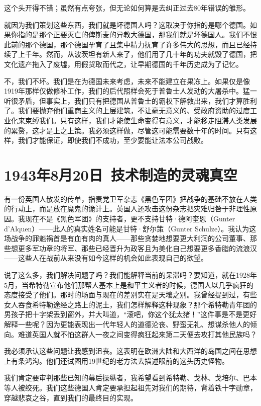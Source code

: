 \documentclass[UTF8]{ctexart}
\begin{document}
这个头开得不错；虽然有点夸张，但无论如何算是去纠正过去80年错误的雏形。

就因为我们策划这些东西，我们就是坏德国人吗？这取决于你指的是哪个德国。如果你指的是那个正要灭亡的俾斯麦的异教大德国，那我们就是坏德国人。我们不恨此前的那个德国，那个德国孕育了且集中精力抚育了许多伟大的思想，而且已经持续了上千年。然而，从波茨坦有新人来了，他们用了几十年的功夫就毁了德国，把文化遗产拖入了废墟，用假货取而代之，让早期德国的千年历史成为了记忆。

不，我们不坏。我们是在为德国未来考虑，未来不能建立在果冻上。如果仅是像1919年那样仅做修补工作，我们的后代照样会死于普鲁士人发动的大屠杀中。猛一听很矛盾，但事实上，我们只有把德国从普鲁士的霸权下解救出来，我们才算胜利了。我们要抛弃他们重商主义的上层建筑，不让毫无意义的、受政府资助的过度工业化来束缚我们。只有这样，我们才能使生命变得有意义，才能移走阻滞人类发展的累赘，这才是上之上策。我必须这样做，尽管这可能需要数十年的时间。只有这样，我们才能保证，即使我们不成功，至少要能让法本公司战败。

\section{1943年8月20日\ 技术制造的灵魂真空}

有一份英国人散发的传单，指责党卫军杂志《黑色军团》把战争的基础不放在人类的行动上，而是放在魔鬼的诡计上。英国人还攻击这份杂志把灾难归咎于非理性原因。我现在不是《黑色军团》的支持者，更不支持甘特·德阿奎恩（Gunter d’Alquen）——此人的真实姓名可能是甘特·舒尔策（Gunter Schulze）。我认为这场战争的罪魁祸首是有血有肉的真人——那些贪婪地想要更大利润的公司董事、那些想更多军功章的将军、那些已经晋升为政客且为美化自己想要更多香脂的流浪汉——这些人在战前从来没有如今这样的机会如此表现自己的欲望。

说了这么多，我们解决问题了吗？我们能解释当前的呆滞吗？要知道，就在1928年5月，当希特勒宣布他们那帮人基本上是和平主义者的时候，德国人以几乎疯狂的态度接受了他们。那时的场面与现在的差别实在是天壤之别。我曾经提到过，有些女人吞食希特勒途经之路上的泥土，我们怎样解释这种现象？那个希特勒青年团的男孩子把十字架丢到窗外，并大叫道，“滚吧，你这个犹太猪！”这件事是不是更好解释一些呢？因为更能表现出一代年轻人的道德沦丧、野蛮无礼、想谋杀他人的倾向。难道英国人就不怕这群人一夜之间变得疯狂起来第二天便去攻打其他民族吗？

我必须承认这些问题让我感到沮丧。这表明在欧洲大陆和大西洋的岛国之间在思想上有条鸿沟。他们还试图用19世纪的老方法去描述眼前的这头历史怪物。

我们肯定要审判那些已知的幕后操纵者，我希望看到希特勒、戈林、戈培尔、巴本等人被绞死。我们这些德国人肯定要承担起祖先对我们的期待，背着铁十字勋章，穿越悲哀之谷，直到我们的最终目的实现。
\end{document}

